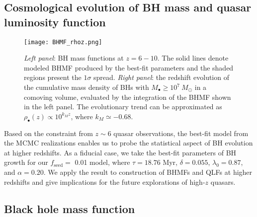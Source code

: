 \documentclass[twocolumn, twocolappendix]{aastex63}
\newcommand{\Msun}{M_\odot}
\newcommand{\Mbh}{M_\bullet}
\newcommand{\tlife}{\tau}
\newcommand{\fseed}{f_\mathrm{seed}}
\newcommand{\red}[1]{\textcolor{red}{ #1}}
\begin{document}
\begin{CJK*}{UTF8}{gbsn}
\vspace{2mm}
\section{Cosmological evolution of BH mass and quasar luminosity function}\label{sec:cosm}


\begin{figure*}
\centering
\texttt{[image: BHMF\_rhoz.png]}
\caption{
{\it Left panel}: BH mass functions at $z=6-10$. 
The solid lines denote modeled BHMF produced by the best-fit parameters 
and the shaded regions present the $1\sigma$ spread. 
{\it Right panel}: the redshift evolution of the cumulative mass density of BHs with $\Mbh \geq 10^7~\Msun$ in a comoving volume, 
evaluated by the integration of the BHMF shown in the left panel.
The evolutionary trend can be approximated as $\rho_\bullet (z) \propto 10^{k_M z}$, where $k_M\simeq -0.68$.
}
\label{fig:BHMF_rhoz}
\vspace{4mm}
\end{figure*}





Based on the constraint from $z\sim 6$ quasar observations, the best-fit model from the MCMC realizations enables
us to probe the statistical aspect of BH evolution at higher redshifts.
As a fiducial case, we take the best-fit parameters of BH growth for our $\fseed=$ 0.01 model,
where $\tlife=18.76$ Myr, $\delta=0.055$, $\lambda_0=0.87$, and $\alpha=0.20$.
We apply the result to construction of BHMFs and QLFs at higher redshifts and give implications for
the future explorations of high-$z$ quasars.



\subsection{Black hole mass function}


\end{CJK*}
\end{document}
